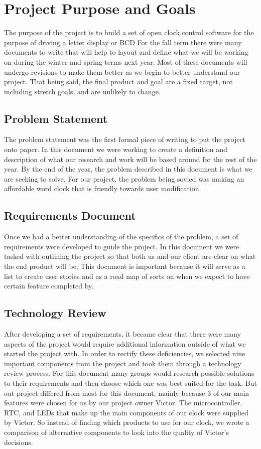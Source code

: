 \documentclass[onecolumn, draftclsnofoot,10pt, compsoc]{IEEEtran}
\begin{document}
\section{Project Purpose and Goals}
The purpose of the project is to build a set of open clock control software for the purpose of driving a letter display or BCD
For the fall term there were many documents to write that will help to layout and define what we will be working on during the winter and spring terms next year.
Most of these documents will undergo revisions to make them better as we begin to better understand our project.
That being said, the final product and goal are a fixed target, not including stretch goals, and are unlikely to change.
\subsection{Problem Statement}
The problem statement was the first formal piece of writing to put the project onto paper.
In this document we were working to create a definition and description of what our research and work will be based around for the rest of the year.
By the end of the year, the problem described in this document is what we are seeking to solve.
For our project, the problem being sovled was making an affordable word clock that is friendly towards user modification.
\subsection{Requirements Document}
Once we had a better understanding of the specifics of the problem, a set of requirements were developed to guide the project.
In this document we were tasked with outlining the project so that both us and our client are clear on what the end product will be.
This document is important because it will serve as a list to create user stories and as a road map of sorts on when we expect to have certain feature completed by.
\subsection{Technology Review}
After developing a set of requirements, it became clear that there were many aspects of the project would require additional information outside of what we started the project with.
In order to rectify these deficiencies, we selected nine important components from the project and took them through a technology review process.
For this document many groups would research possible solutions to their requirements and then choose which one was best suited for the task.
But out project differed from most for this document, mainly because 3 of our main features were chosen for us by our project owner Victor.
The microcontroller, RTC, and LEDs that make up the main components of our clock were supplied by Victor.
So instead of finding which products to use for our clock, we wrote a comparison of alternative components to look into the quality of Victor's decisions.
\end{document}
